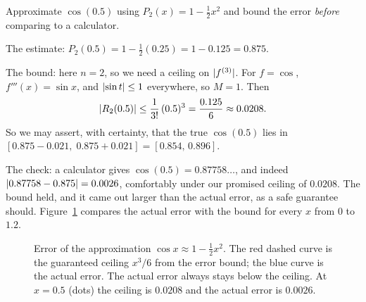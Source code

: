 \begin{labbox}
Approximate $\cos(0.5)$ using $P_2(x) = 1 - \tfrac12 x^2$ and bound the error
\emph{before} comparing to a calculator.

The estimate: $P_2(0.5) = 1 - \tfrac12(0.25) = 1 - 0.125 = 0.875$.

The bound: here $n=2$, so we need a ceiling on $\lvert f^{(3)}\rvert$. For $f=\cos$,
$f'''(x) = \sin x$, and $\lvert\sin t\rvert \le 1$ everywhere, so $M=1$. Then
\[
  \lvert R_2(0.5)\rvert \le \frac{1}{3!}\,(0.5)^3 = \frac{0.125}{6} \approx 0.0208.
\]
So we may assert, with certainty, that the true $\cos(0.5)$ lies in
$[0.875 - 0.021,\; 0.875 + 0.021] = [0.854,\, 0.896]$.

The check: a calculator gives $\cos(0.5) = 0.87758\ldots$, and indeed
$\lvert0.87758 - 0.875\rvert = 0.0026$, comfortably under our promised ceiling of
$0.0208$. The bound held, and it came out larger than the actual error, as a safe
guarantee should. Figure~\ref{ch31:fig-cos-error} compares the actual error with the
bound for every $x$ from $0$ to $1.2$.
\end{labbox}

\begin{figure}[H]
\centering
{}
\caption{Error of the approximation $\cos x \approx 1 - \tfrac12 x^2$. The red dashed curve
is the guaranteed ceiling $x^3/6$ from the error bound; the blue curve is the actual error.
The actual error always stays below the ceiling. At $x = 0.5$ (dots) the ceiling is $0.0208$
and the actual error is $0.0026$.}
\label{ch31:fig-cos-error}
\end{figure}

